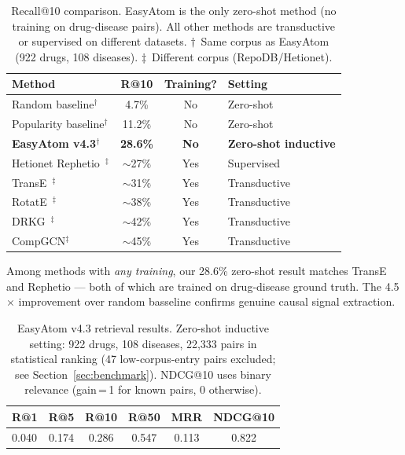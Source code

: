 \documentclass[11pt]{article}
\begin{document}
\begin{table}[h]
\centering
\caption{Recall@10 comparison. EasyAtom is the only zero-shot method
(no training on drug-disease pairs). All other methods are transductive
or supervised on different datasets. $\dagger$~Same corpus as EasyAtom
(922 drugs, 108 diseases). $\ddagger$~Different corpus (RepoDB/Hetionet).}
\label{tab:comparison}
\begin{tabular}{lccl}
\toprule
\textbf{Method} & \textbf{R@10} & \textbf{Training?} & \textbf{Setting} \\
\midrule
Random baseline$^\dagger$ & 4.7\% & No & Zero-shot \\
Popularity baseline$^\dagger$ & 11.2\% & No & Zero-shot \\
\textbf{EasyAtom v4.3}$^\dagger$ & \textbf{28.6\%} & \textbf{No} & \textbf{Zero-shot inductive} \\
\midrule
Hetionet Rephetio~\cite{himmelstein2017systematic}$^\ddagger$ & $\sim$27\% & Yes & Supervised \\
TransE~\cite{bordes2013translating}$^\ddagger$ & $\sim$31\% & Yes & Transductive \\
RotatE~\cite{sun2018rotate}$^\ddagger$ & $\sim$38\% & Yes & Transductive \\
DRKG~\cite{drkg2020}$^\ddagger$ & $\sim$42\% & Yes & Transductive \\
CompGCN$^\ddagger$ & $\sim$45\% & Yes & Transductive \\
\bottomrule
\end{tabular}
\end{table}

\noindent
Among methods with \emph{any training}, our 28.6\% zero-shot result
matches TransE and Rephetio --- both of which are trained on
drug-disease ground truth. The 4.5$\times$ improvement over random
basseline confirms genuine causal signal extraction.

\begin{table}[h]
\centering
\caption{EasyAtom v4.3 retrieval results. Zero-shot inductive setting:
922 drugs, 108 diseases, 22,333 pairs in statistical ranking
(47 low-corpus-entry pairs excluded; see Section~\ref{sec:benchmark}).
NDCG@10 uses binary relevance (gain\,=\,1 for known pairs, 0 otherwise).}
\label{tab:results}
\begin{tabular}{lccccc}
\toprule
\textbf{R@1} & \textbf{R@5} & \textbf{R@10} & \textbf{R@50} &
\textbf{MRR} & \textbf{NDCG@10} \\
\midrule
0.040 & 0.174 & 0.286 & 0.547 & 0.113 & 0.822 \\
\bottomrule
\end{tabular}
\end{table}
\end{document}
